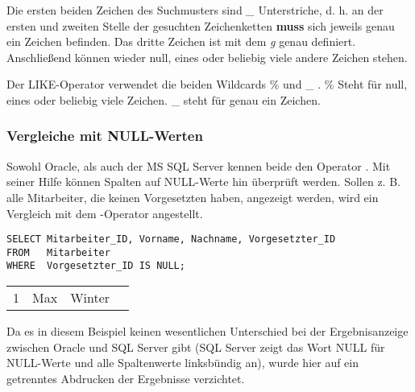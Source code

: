           Die ersten beiden Zeichen des Suchmusters sind \textit{\_} Unterstriche, d. h. an der ersten und zweiten Stelle der gesuchten Zeichenketten \textbf{muss} sich jeweils genau ein Zeichen befinden. Das dritte Zeichen ist mit dem \textit{g} genau definiert. Anschließend können wieder null, eines oder beliebig viele andere Zeichen stehen.

          \begin{merke}
            Der LIKE-Operator verwendet die beiden Wildcards \% und \_ . \% Steht für null, eines oder beliebig viele Zeichen. \_ steht für genau ein Zeichen.
          \end{merke}
        \subsubsection{Vergleiche mit NULL-Werten}
          Sowohl Oracle, als auch der MS SQL Server kennen beide den Operator . Mit seiner Hilfe können Spalten auf NULL-Werte hin überprüft werden. Sollen z. B. alle Mitarbeiter, die keinen Vorgesetzten haben, angezeigt werden, wird ein Vergleich mit dem -Operator angestellt.
          \begin{lstlisting}[language=oracle_sql,caption={Der IS NULL Operator},label=sql02_10]
SELECT Mitarbeiter_ID, Vorname, Nachname, Vorgesetzter_ID
FROM   Mitarbeiter
WHERE  Vorgesetzter_ID IS NULL;
          \end{lstlisting}
          \begin{center}
            \begin{small}
              \tablehead{}
              \begin{msoraclesql}
                \begin{supertabular}{rllr}
                1 & Max & Winter & \\
                \end{supertabular}
              \end{msoraclesql}
            \end{small}
          \end{center}
          Da es in diesem Beispiel keinen wesentlichen Unterschied bei der Ergebnisanzeige zwischen Oracle und SQL Server gibt (SQL Server zeigt das Wort NULL für NULL-Werte und alle Spaltenwerte linksbündig an), wurde hier auf ein getrenntes Abdrucken der Ergebnisse verzichtet.

